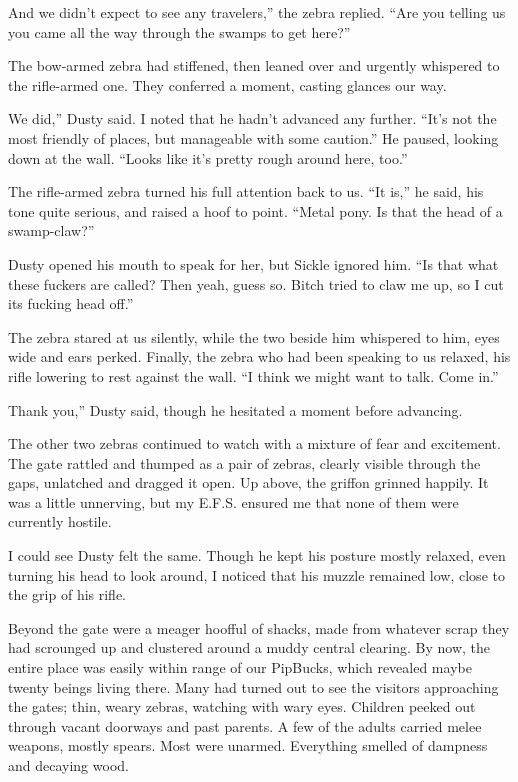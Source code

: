 \leavevmode{}And we didn’t expect to see any travelers,” the zebra replied. “Are you telling us you came all the way through the swamps to get here?”

The bow-armed zebra had stiffened, then leaned over and urgently whispered to the rifle-armed one. They conferred a moment, casting glances our way.

\leavevmode{}We did,” Dusty said. I noted that he hadn’t advanced any further. “It’s not the most friendly of places, but manageable with some caution.” He paused, looking down at the wall. “Looks like it’s pretty rough around here, too.”

The rifle-armed zebra turned his full attention back to us. “It is,” he said, his tone quite serious, and raised a hoof to point. “Metal pony. Is that the head of a swamp-claw?”

Dusty opened his mouth to speak for her, but Sickle ignored him. “Is that what these fuckers are called? Then yeah, guess so. Bitch tried to claw me up, so I cut its fucking head off.”

The zebra stared at us silently, while the two beside him whispered to him, eyes wide and ears perked. Finally, the zebra who had been speaking to us relaxed, his rifle lowering to rest against the wall. “I think we might want to talk. Come in.”

\leavevmode{}Thank you,” Dusty said, though he hesitated a moment before advancing.

The other two zebras continued to watch with a mixture of fear and excitement. The gate rattled and thumped as a pair of zebras, clearly visible through the gaps, unlatched and dragged it open. Up above, the griffon grinned happily. It was a little unnerving, but my E.F.S. ensured me that none of them were currently hostile.

I could see Dusty felt the same. Though he kept his posture mostly relaxed, even turning his head to look around, I noticed that his muzzle remained low, close to the grip of his rifle.

Beyond the gate were a meager hoofful of shacks, made from whatever scrap they had scrounged up and clustered around a muddy central clearing. By now, the entire place was easily within range of our PipBucks, which revealed maybe twenty beings living there. Many had turned out to see the visitors approaching the gates; thin, weary zebras, watching with wary eyes. Children peeked out through vacant doorways and past parents. A few of the adults carried melee weapons, mostly spears. Most were unarmed. Everything smelled of dampness and decaying wood.

